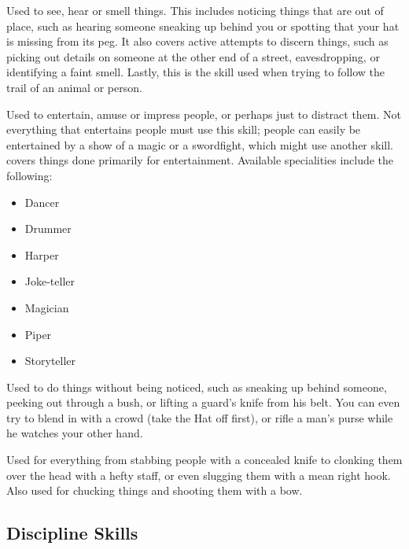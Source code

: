 
Used to see, hear or smell things.
This includes noticing things that are out of place, such as hearing someone sneaking up behind you or spotting that your hat is missing from its peg.
It also covers active attempts to discern things, such as picking out details on someone at the other end of a street, eavesdropping, or identifying a faint smell.
Lastly, this is the skill used when trying to follow the trail of an animal or person.


Used to entertain, amuse or impress people, or perhaps just to distract them.
Not everything that entertains people must use this skill; people can easily be entertained by a show of a magic or a swordfight, which might use another skill.
 covers things done primarily for entertainment.
Available specialities include the following:

\begin{itemize}
	\item Dancer
	\item Drummer
	\item Harper
	\item Joke-teller
	\item Magician
	\item Piper
	\item Storyteller
\end{itemize}


Used to do things without being noticed, such as sneaking up behind someone, peeking out through a bush, or lifting a guard's knife from his belt.
You can even try to blend in with a crowd (take the Hat off first), or rifle a man's purse while he watches your other hand.


Used for everything from stabbing people with a concealed knife to clonking them over the head with a hefty staff, or even slugging them with a mean right hook.
Also used for chucking things and shooting them with a bow.

\subsection{Discipline Skills}


